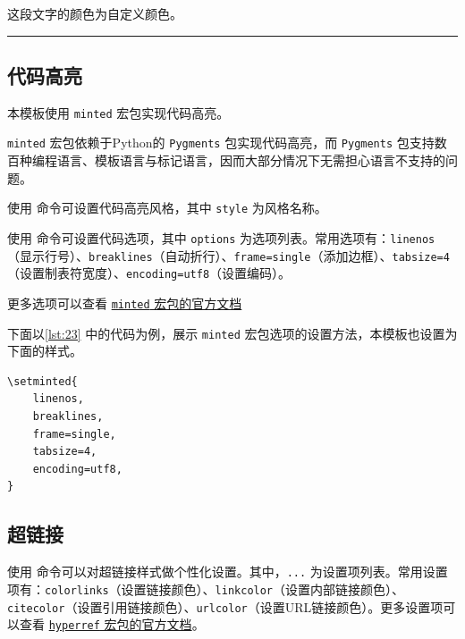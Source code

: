 \documentclass[a4paper]{article}
\begin{document}
\textcolor{mycolor}{这段文字的颜色为自定义颜色。}

\vspace{0.25cm}
\hrule
\vspace{0.25cm}

\subsection{代码高亮}

本模板使用 \texttt{minted} 宏包实现代码高亮。

\texttt{minted} 宏包依赖于Python的 \texttt{Pygments} 包实现代码高亮，而 \texttt{Pygments} 包支持数百种编程语言、模板语言与标记语言，因而大部分情况下无需担心语言不支持的问题。

使用 \texttt{} 命令可设置代码高亮风格，其中 \texttt{style} 为风格名称。

使用 \texttt{} 命令可设置代码选项，其中 \texttt{options} 为选项列表。常用选项有：\texttt{linenos}（显示行号）、\texttt{breaklines}（自动折行）、\texttt{frame=single}（添加边框）、\texttt{tabsize=4}（设置制表符宽度）、\texttt{encoding=utf8}（设置编码）。

更多选项可以查看 \href{https://mirror.math.princeton.edu/pub/CTAN/macros/latex/contrib/minted/minted.pdf}{\texttt{minted} 宏包的官方文档}

下面以\cref{lst:23} 中的代码为例，展示 \texttt{minted} 宏包选项的设置方法，本模板也设置为下面的样式。

\begin{center}
    \label{lst:23}
    \begin{verbatim}
\setminted{
    linenos,
    breaklines,
	frame=single,
	tabsize=4,
	encoding=utf8,
}
    \end{verbatim}
\end{center}

\subsection{超链接}

使用 \texttt{\hypersetup{...}} 命令可以对超链接样式做个性化设置。其中，\texttt{...} 为设置项列表。常用设置项有：\texttt{colorlinks}（设置链接颜色）、\texttt{linkcolor}（设置内部链接颜色）、\texttt{citecolor}（设置引用链接颜色）、\texttt{urlcolor}（设置URL链接颜色）。更多设置项可以查看 \href{https://mirror.math.princeton.edu/pub/CTAN/macros/latex/contrib/hyperref/doc/hyperref-doc.pdf}{\texttt{hyperref} 宏包的官方文档}。
\end{document}
